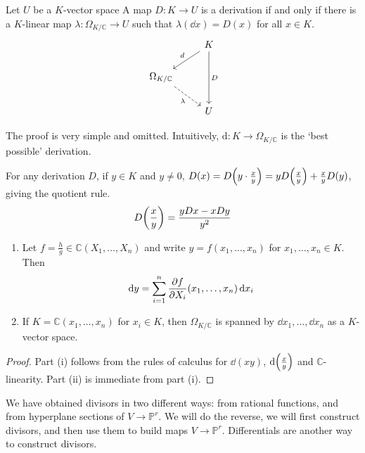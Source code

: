 \begin{lemma}
    Let \( U \) be a \( K \)-vector space
    A map \( D \colon K \to U \) is a derivation if and only if there is a \( K \)-linear map \( \lambda \colon \Omega_{K/\mathbb C} \to U \) such that \( \lambda(\dd{x}) = D(x) \) for all \( x \in K \).
    \[\begin{tikzcd}
        & K \\
        {\Omega_{K/\mathbb C}} \\
        & U
        \arrow["d"', from=1-2, to=2-1]
        \arrow["\lambda"', dashed, from=2-1, to=3-2]
        \arrow["D", from=1-2, to=3-2]
    \end{tikzcd}\]
\end{lemma}
The proof is very simple and omitted.
Intuitively, \( \mathrm{d} \colon K \to \Omega_{K/\mathbb C} \) is the `best possible' derivation.
\begin{remark}
    For any derivation \( D \), if \( y \in K \) and \( y \neq 0 \), \( D(x) = D\qty(y \cdot \frac{x}{y}) = yD\qty(\frac{x}{y}) + \frac{x}{y} D(y) \), giving the quotient rule.
    \[ D\qty(\frac{x}{y}) = \frac{yDx - xDy}{y^2} \]
\end{remark}
\begin{lemma}
    \begin{enumerate}
        \item Let \( f = \frac{h}{g} \in \mathbb C(X_1, \dots, X_n) \) and write \( y = f(x_1, \dots, x_n) \) for \( x_1, \dots, x_n \in K \).
        Then
        \[ \dd{y} = \sum_{i=1}^n \pdv{f}{X_i}\qty(x_1, \dots, x_n) \dd{x_i} \]
        \item If \( K = \mathbb C(x_1, \dots, x_n) \) for \( x_i \in K \), then \( \Omega_{K/\mathbb C} \) is spanned by \( \dd{x_1}, \dots, \dd{x_n} \) as a \( K \)-vector space.
    \end{enumerate}
\end{lemma}
\begin{proof}
    Part (i) follows from the rules of calculus for \( \dd{(xy)} \), \( \dd{\qty(\frac{x}{y})} \) and \( \mathbb C \)-linearity.
    Part (ii) is immediate from part (i).
\end{proof}
We have obtained divisors in two different ways: from rational functions, and from hyperplane sections of \( V \to \mathbb P^r \).
We will do the reverse, we will first construct divisors, and then use them to build maps \( V \to \mathbb P^r \).
Differentials are another way to construct divisors.

